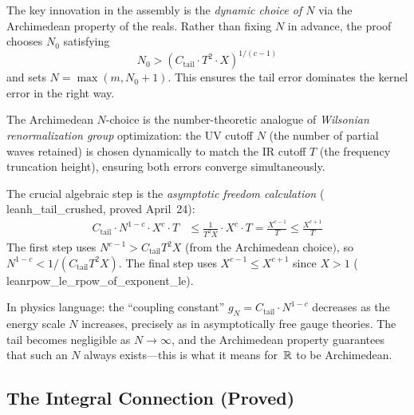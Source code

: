 \documentclass[11pt,a4paper]{article}
\begin{document}
The key innovation in the assembly is the \emph{dynamic choice of $N$}
via the Archimedean property of the reals. Rather than fixing $N$ in
advance, the proof chooses $N_0$ satisfying
\[
  N_0 > (C_{\mathrm{tail}} \cdot T^2 \cdot X)^{1/(c-1)}
\]
and sets $N = \max(m, N_0 + 1)$. This ensures the tail error dominates
the kernel error in the right way.

\begin{principle}
The Archimedean $N$-choice is the number-theoretic analogue of
\emph{Wilsonian renormalization group} optimization: the UV cutoff $N$
(the number of partial waves retained) is chosen dynamically to match
the IR cutoff $T$ (the frequency truncation height), ensuring both
errors converge simultaneously.

The crucial algebraic step is the \emph{asymptotic freedom calculation}
(\\lean{h\_tail\_crushed}, proved April~24):
\begin{align}
  C_{\mathrm{tail}} \cdot N^{1-c} \cdot X^c \cdot T
  &\leq \frac{1}{T^2 X} \cdot X^c \cdot T
  = \frac{X^{c-1}}{T}
  \leq \frac{X^{c+1}}{T}
\end{align}
The first step uses $N^{c-1} > C_{\mathrm{tail}} T^2 X$ (from the
Archimedean choice$)$, so $N^{1-c} < 1/(C_{\mathrm{tail}} T^2 X)$.
The final step uses $X^{c-1} \leq X^{c+1}$ since $X > 1$
(\\lean{rpow\_le\_rpow\_of\_exponent\_le}).

In physics language: the ``coupling constant'' $g_N = C_{\mathrm{tail}} \cdot N^{1-c}$
decreases as the energy scale $N$ increases, precisely as in
asymptotically free gauge theories. The tail becomes negligible as
$N \to \infty$, and the Archimedean property guarantees that such an
$N$ always exists---this is what it means for~$\mathbb{R}$ to be Archimedean.
\end{principle}

\subsection{The Integral Connection (Proved)}
\end{document}
